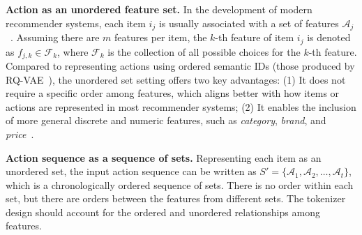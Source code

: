 \textbf{Action as an unordered feature set.}
In the development of modern recommender systems, each item $i_j$ is usually associated with a set of features $\mathcal{A}_j$~\cite{zhang2019fdsa,zhou2020s3,cheng2016wd}. Assuming there are $m$ features per item, the $k$-th feature of item $i_j$ is denoted as $f_{j,k} \in \mathcal{F}_k$, where $\mathcal{F}_k$ is the collection of all possible choices for the $k$-th feature.
Compared to representing actions using ordered semantic IDs (\eg those produced by RQ-VAE~\cite{rajput2023tiger,singh2024spmsid}), the unordered set setting offers two key advantages: (1) It does not require a specific order among features, which aligns better with how items or actions are represented in most recommender systems; (2) It enables the inclusion of more general discrete and numeric features, such as \emph{category}, \emph{brand}, and \emph{price}~\cite{pazzani2007content,juan2016field}.

\textbf{Action sequence as a sequence of sets.}
Representing each item as an unordered set, the input action sequence can be written as $S'=\{\mathcal{A}_1, \mathcal{A}_2, \ldots, \mathcal{A}_t\}$, which is a chronologically ordered sequence of sets. There is no order within each set,
but there are orders between the features from different sets. The tokenizer design should account for the ordered and unordered relationships among features.

